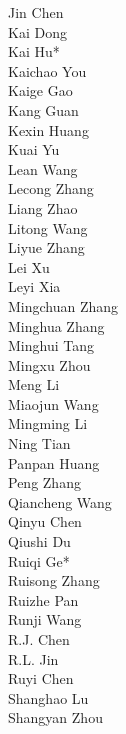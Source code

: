 \documentclass[11pt, a4paper, logo, copyright, nonumbering]{deepseek}
\begin{document}
\begin{multicols}{2}
\color{damaiblue} Jin Chen \\
\color{damaiblue} Kai Dong \\
\color{damaiblue} Kai Hu* \\
\color{damaiblue} Kaichao You \\
\color{damaiblue} Kaige Gao \\
\color{damaiblue} Kang Guan \\
\color{damaiblue} Kexin Huang \\
\color{damaiblue} Kuai Yu \\
\color{damaiblue} Lean Wang \\
\color{damaiblue} Lecong Zhang \\
\color{damaiblue} Liang Zhao \\
\color{damaiblue} Litong Wang \\
\color{damaiblue} Liyue Zhang \\
\color{damaiblue} Lei Xu \\
\color{damaiblue} Leyi Xia \\
\color{damaiblue} Mingchuan Zhang \\
\color{damaiblue} Minghua Zhang \\
\color{damaiblue} Minghui Tang \\
\color{damaiblue} Mingxu Zhou \\
\color{damaiblue} Meng Li \\
\color{damaiblue} Miaojun Wang \\
\color{damaiblue} Mingming Li \\
\color{damaiblue} Ning Tian \\
\color{damaiblue} Panpan Huang \\
\color{damaiblue} Peng Zhang \\
\color{damaiblue} Qiancheng Wang \\
\color{damaiblue} Qinyu Chen \\
\color{damaiblue} Qiushi Du \\
\color{damaiblue} Ruiqi Ge* \\
\color{damaiblue} Ruisong Zhang \\
\color{damaiblue} Ruizhe Pan \\
\color{damaiblue} Runji Wang \\
\color{damaiblue} R.J. Chen \\
\color{damaiblue} R.L. Jin \\
\color{damaiblue} Ruyi Chen \\
\color{damaiblue} Shanghao Lu \\
\color{damaiblue} Shangyan Zhou \\

\end{multicols}
\end{document}
